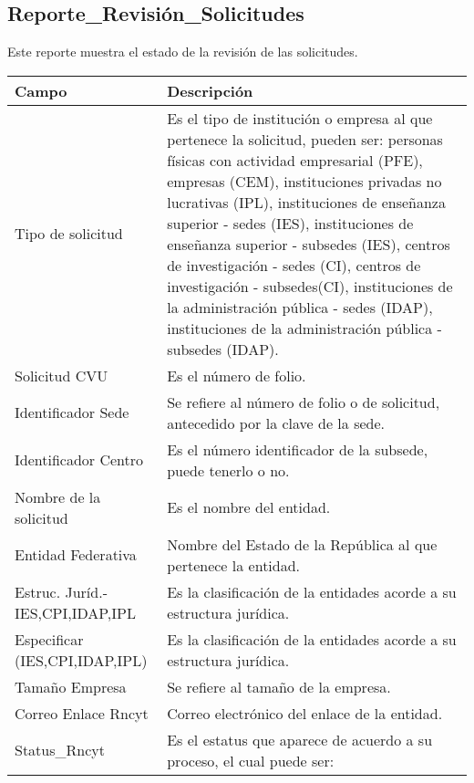 \newpage
\subsection{Reporte\_Revisión\_Solicitudes}
\label{appendix:Reportes:PeopleSoft:ReporteRevSolic}

Este reporte muestra el estado de la revisión de las solicitudes.\\

\begin{tabular}{ m{} m{}  }%
	\rowcolor{gray1} {\bf Campo} &  {\bf Descripción} \\ \hline \hline

	Tipo de solicitud & Es el tipo de institución o empresa al que pertenece la solicitud, pueden ser: personas físicas con actividad empresarial (PFE), empresas (CEM), instituciones privadas no lucrativas (IPL), instituciones de enseñanza superior - sedes (IES), instituciones de enseñanza superior - subsedes (IES), centros de investigación - sedes (CI), centros de investigación - subsedes(CI), instituciones de la administración pública - sedes (IDAP), instituciones de la administración pública - subsedes (IDAP).\\
	\rowcolor{gray1}Solicitud CVU & Es el número de folio.\\
	Identificador Sede & Se refiere al número de folio o de solicitud, antecedido por la clave de la sede.\\
	\rowcolor{gray1}Identificador Centro & Es el número identificador de la subsede, puede tenerlo o no.\\
	Nombre de la solicitud & Es el nombre del entidad.\\
	\rowcolor{gray1}Entidad Federativa & Nombre del Estado de la República al que pertenece la entidad.\\
	Estruc. Juríd.-IES,CPI,IDAP,IPL & Es la clasificación de la entidades acorde a su estructura jurídica.\\
	\rowcolor{gray1}Especificar (IES,CPI,IDAP,IPL) & Es la clasificación de la entidades acorde a su estructura jurídica.\\
	Tamaño Empresa & Se refiere al tamaño de la empresa.\\
	\rowcolor{gray1}Correo Enlace Rncyt & Correo electrónico del enlace de la entidad.\\
	Status\_Rncyt & Es el estatus que aparece de acuerdo a su proceso, el cual puede ser:\\

\end{tabular}
